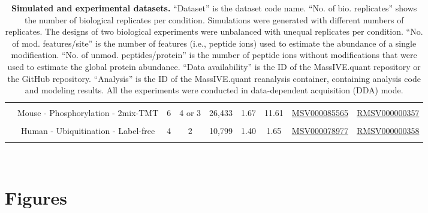 \documentclass[mcp]{article}
\numberwithin{table}{section}
\begin{document}
\begin{table}[ht]
\begin{tiny}
\begin{tabular}{|c|c|ccccc|cc|}
&&&&&&&& \\%
& Mouse - Phosphorylation - 2mix-TMT& 6 & 4 or 3 & 26,433 & 1.67 & 11.61 & \href{https://massive.ucsd.edu/ProteoSAFe/dataset.jsp?task=4878d777c6b34cf8aaf8477e93140c4d}{MSV000085565} & \href{https://massive.ucsd.edu/ProteoSAFe/reanalysis_container.jsp?task=79406d32c1f9413daf7756e6eeb24968}{RMSV000000357}\\
&&&&&&&& \\%
& Human - Ubiquitination - Label-free & 4 & 2 & 10,799 & 1.40 & 1.65 & \href{https://massive.ucsd.edu/ProteoSAFe/dataset.jsp?task=1b516164de5345108b40b75147dd58b5}{MSV000078977} & \href{https://massive.ucsd.edu/ProteoSAFe/reanalysis_container.jsp?task=f9e6117e00794ce5b2e8802601be16bc}{RMSV000000358}\\ [0.02in]
 &&&&&&&& \\
 \hline
\end{tabular}\\
\end{tiny}
\caption{ \small {\bf Simulated and experimental datasets.} 
``Dataset'' is the dataset code name. ``No. of bio. replicates'' shows the number of biological replicates per condition. Simulations were generated with different numbers of replicates. The designs of two biological experiments were unbalanced with unequal replicates per condition. ``No. of mod. features/site'' is the number of features (i.e., peptide ions) used to estimate the abundance of a single modification. ``No. of unmod. peptides/protein'' is the number of peptide ions without modifications that were used to estimate the global protein abundance. ``Data availability'' is the ID of the MassIVE.quant repository or the GitHub repository. ``Analysis'' is the ID of the MassIVE.quant reanalysis container, containing analysis code and modeling results. All the experiments were conducted in data-dependent acquisition (DDA) mode. }

\label{tab:dataDescription}
\end{table}

\newpage
\section{Figures}
\end{document}
